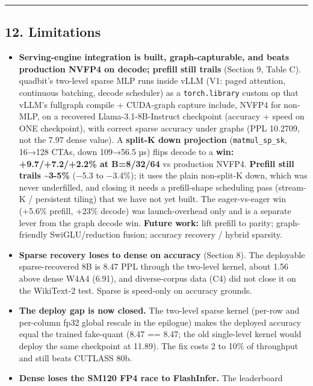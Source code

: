 \documentclass[
]{article}
\providecommand{\tightlist}{%
  \setlength{\itemsep}{0pt}\setlength{\parskip}{0pt}}
\begin{document}
\begin{center}\rule{0.5\linewidth}{0.5pt}\end{center}

\subsection{12. Limitations}\label{limitations}

\begin{itemize}
\tightlist
\item
  \textbf{Serving-engine integration is built, graph-capturable, and
  beats production NVFP4 on decode; prefill still trails} (Section 9,
  Table C). quadbit's two-level sparse MLP runs inside vLLM (V1: paged
  attention, continuous batching, decode scheduler) as a
  \texttt{torch.library} custom op that vLLM's fullgraph compile +
  CUDA-graph capture include, NVFP4 for non-MLP, on a recovered
  Llama-3.1-8B-Instruct checkpoint (accuracy + speed on ONE checkpoint),
  with correct sparse accuracy under graphs (PPL 10.2709, not the 7.97
  dense value). A \textbf{split-K down projection}
  (\texttt{matmul\_sp\_sk}, 16→128 CTAs, down 109→56.5 µs) flips decode
  to a \textbf{win: +9.7/+7.2/+2.2\% at B=8/32/64} vs production NVFP4.
  \textbf{Prefill still trails \textasciitilde3-5\%} (−5.3 to −3.4\%);
  it uses the plain non-split-K down, which was never underfilled, and
  closing it needs a prefill-shape scheduling pass (stream-K /
  persistent tiling) that we have not yet built. The eager-vs-eager win
  (+5.6\% prefill, +23\% decode) was launch-overhead only and is a
  separate lever from the graph decode win. \textbf{Future work:} lift
  prefill to parity; graph-friendly SwiGLU/reduction fusion; accuracy
  recovery / hybrid sparsity.
\item
  \textbf{Sparse recovery loses to dense on accuracy} (Section 8). The
  deployable sparse-recovered 8B is 8.47 PPL through the two-level
  kernel, about 1.56 above dense W4A4 (6.91), and diverse-corpus data
  (C4) did not close it on the WikiText-2 test. Sparse is speed-only on
  accuracy grounds.
\item
  \textbf{The deploy gap is now closed.} The two-level sparse kernel
  (per-row and per-column fp32 global rescale in the epilogue) makes the
  deployed accuracy equal the trained fake-quant (8.47 == 8.47; the old
  single-level kernel would deploy the same checkpoint at 11.89). The
  fix costs 2 to 10\% of throughput and still beats CUTLASS 80b.
\item
  \textbf{Dense loses the SM120 FP4 race to FlashInfer.} The leaderboard

\end{itemize}
\end{document}
